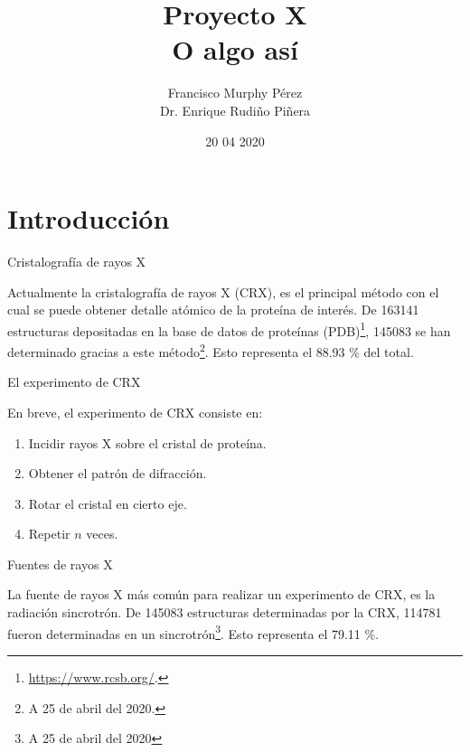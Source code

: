 \documentclass{beamer}
\title{Proyecto X \\ O algo así}
\author{Francisco Murphy Pérez \\ Dr. Enrique Rudiño Piñera}
\institute{Instituto de Biotecnología \\ Universidad Nacional Autónoma de México}
\date{20 04 2020}
\begin{document}

\begin{frame}
	\maketitle %
\end{frame}


\section{Introducción}

\begin{frame}{Cristalografía de rayos X}

Actualmente la cristalografía de rayos X (CRX), es el principal método con el cual se puede obtener detalle atómico de la proteína de interés. De 163141 estructuras depositadas en la base de datos de proteínas (PDB)\footnote{\url{https://www.rcsb.org/}.}, 145083 se han determinado gracias a este método\footnote{A 25 de abril del 2020.}. Esto representa el 88.93 \% del total.

\end{frame}

\begin{frame}{El experimento de CRX}

En breve, el experimento de CRX consiste en:

\begin{enumerate}
	\item Incidir \alert{rayos X} sobre el cristal de proteína. 
	\item Obtener el patrón de difracción. 
	\item Rotar el cristal en cierto eje. 
	\item Repetir $n$ veces.
\end{enumerate}

\end{frame}

\begin{frame}{Fuentes de rayos X}

La fuente de rayos X más común para realizar un experimento de CRX, es la radiación sincrotrón. De 145083 estructuras determinadas por la CRX, 114781 fueron determinadas en un sincrotrón\footnote{A 25 de abril del 2020}. Esto representa el 79.11 \%. 

\end{frame}
\end{document}
